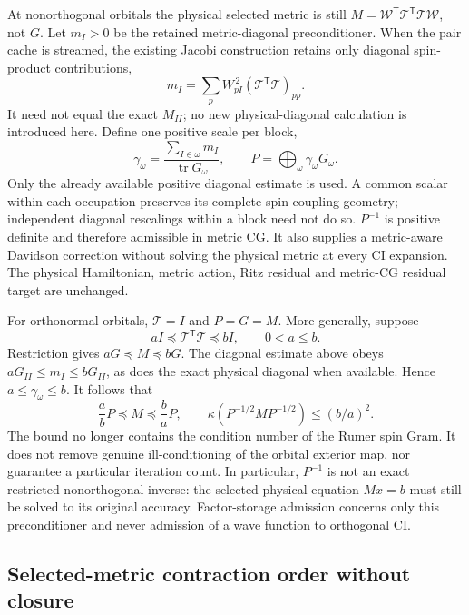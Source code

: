 \documentclass[11pt,a4paper]{article}
\newcommand{\Tr}{^{\mathsf T}}
\newcommand{\Wa}{\mathcal W}
\newcommand{\Ta}{\mathcal T}
\begin{document}
At nonorthogonal orbitals the physical selected metric is still
$M=\Wa\Tr\Ta\Tr\Ta\Wa$, not $G$. Let $m_I>0$ be the retained
metric-diagonal preconditioner. When the pair cache is streamed, the existing
Jacobi construction retains only diagonal spin-product contributions,
\begin{equation}
 m_I=\sum_p W_{pI}^{\,2}(\Ta\Tr\Ta)_{pp}.
\end{equation}
It need not equal the exact $M_{II}$; no new physical-diagonal calculation is
introduced here. Define one positive scale per block,
\begin{equation}
 \gamma_\omega=
 \frac{\sum_{I\in\omega}m_I}{\operatorname{tr}G_\omega},
 \qquad P=\bigoplus_\omega \gamma_\omega G_\omega.
\end{equation}
Only the already available positive diagonal estimate is used. A common scalar
within each occupation preserves its complete spin-coupling geometry;
independent diagonal rescalings within a block need not do so.
$P^{-1}$ is positive definite and therefore admissible in metric CG. It
also supplies a metric-aware Davidson correction without solving the
physical metric at every CI expansion. The physical Hamiltonian, metric
action, Ritz residual and metric-CG residual target are unchanged.

For orthonormal orbitals, $\Ta=I$ and $P=G=M$. More generally, suppose
\begin{equation}
 aI\preceq\Ta\Tr\Ta\preceq bI,\qquad 0<a\leq b.
\end{equation}
Restriction gives $aG\preceq M\preceq bG$. The diagonal estimate above
obeys $aG_{II}\leq m_I\leq bG_{II}$, as does the exact physical diagonal
when available. Hence $a\leq\gamma_\omega\leq b$. It follows that
\begin{equation}
 \frac{a}{b}P\preceq M\preceq\frac{b}{a}P,
 \qquad
 \kappa(P^{-1/2}MP^{-1/2})\leq (b/a)^2.
\end{equation}
The bound no longer contains the condition number of the Rumer spin Gram.
It does not remove genuine ill-conditioning of the orbital exterior map,
nor guarantee a particular iteration count. In particular, $P^{-1}$ is not
an exact restricted nonorthogonal inverse: the selected physical equation
$Mx=b$ must still be solved to its original accuracy. Factor-storage
admission concerns only this preconditioner and never admission of a
wave function to orthogonal CI.

\subsection{Selected-metric contraction order without closure}
\label{sec:selected-metric-order}
\end{document}
